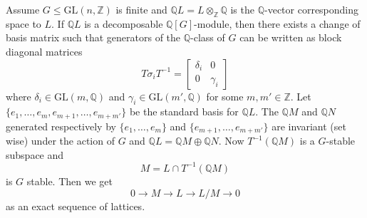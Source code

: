 \documentclass[12pt]{article}
\theoremstyle{plain}
\theoremstyle{definition}
\newcommand{\Z}{\ensuremath{\mathbb{Z}}}
\newcommand{\Q}{\ensuremath{\mathbb{Q}}}
\begin{document}
Assume $G \leq \mathrm{GL}(n,\Z)$ is finite and $\Q L = L \otimes_{\Z} \Q$ is the $\Q$-vector corresponding space to $L$. If $\Q L$ is a decomposable $\Q[G]$-module, then there exists a change of basis matrix such that generators of the $\Q$-class of $G$ can be written as block diagonal matrices
$$
T \sigma_i T^{-1} =  \left[ \begin{array}{c|c}
\delta_i & 0 \\
\hline
0 & \gamma_i
\end{array} \right]
$$
where $\delta_i	\in \mathrm{GL}(m,\Q)$ and $ \gamma_i \in \mathrm{GL}(m',\Q)$ for some $m, m' \in \Z$. Let $\lbrace e_1, \ldots, e_m, e_{m+1}, \ldots , e_{m+m'}\rbrace$ be the standard basis for $\Q L$. The $\Q M$ and $\Q N$ generated respectively by $\lbrace e_1, \ldots, e_m \rbrace$ and 
$\lbrace e_{m+1}, \ldots , e_{m+m'} \rbrace$ are invariant (set wise) under the action of $G$ and $\Q L = \Q M \oplus \Q N$. Now $T^{-1}(\Q M)$ is a $G$-stable subspace and $$M = L \cap T^{-1}(\Q M) $$ is $G$ stable. Then we get 
$$0 \longrightarrow M \longrightarrow L \longrightarrow L/M \longrightarrow 0$$
as an exact sequence of lattices.
\end{document}
